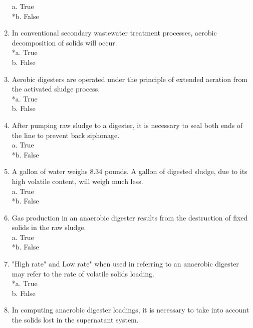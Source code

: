 \begin{enumerate}
a. True \\
*b. False \\

\item  In conventional secondary wastewater treatment processes, aerobic decomposition of solids will occur. \\

*a. True \\
b. False \\

\item  Aerobic digesters are operated under the principle of extended aeration from the activated sludge process. \\

*a. True \\
b. False \\

\item  After pumping raw sludge to a digester, it is necessary to seal both ends of the line to prevent back siphonage. \\

a. True \\
*b. False \\

\item  A gallon of water weighs 8.34 pounds.  A gallon of digested sludge, due to its high volatile content, will weigh much less. \\

a. True \\
*b. False \\

\item  Gas production in an anaerobic digester results from the destruction of fixed solids in the raw sludge. \\

a. True \\
*b. False \\

\item  "High rate" and Low rate" when used in referring to an anaerobic digester may refer to the rate of volatile solids loading. \\

*a. True \\
b. False \\

\item  In computing anaerobic digester loadings, it is necessary to take into account the solids lost in the supernatant system. \\


\end{enumerate}
